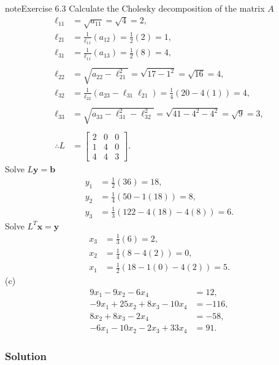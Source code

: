 \documentclass[letterpaper,10pt,english]{jupyterBook}
\begin{document}
\begin{sphinxadmonition}{note}{Exercise 6.3}
\sphinxAtStartPar
Calculate the Cholesky decomposition of the matrix \(A\)
\begin{align*}
    \ell_{11} &= \sqrt{ a_{11} } = \sqrt{ 4 } = 2, \\
    \ell_{21} &= \frac{1}{\ell_{11}} \left( a_{12} \right) = \frac{1}{2} \left( 2 \right) = 1, \\
    \ell_{31} &= \frac{1}{\ell_{11}} \left( a_{13} \right) = \frac{1}{2} \left( 8 \right) = 4, \\
    \\
    \ell_{22} &= \sqrt{ a_{22} - \ell_{21}^2 } = \sqrt{ 17 - 1^2 } = \sqrt{ 16 } = 4, \\
    \ell_{32} &= \frac{1}{\ell_{22}} \left( a_{23} - \ell_{31} \ell_{21} \right) = \frac{1}{4} \left( 20 - 4 \left( 1 \right) \right) = 4, \\
    \\
    \ell_{33} &= \sqrt{ a_{33} - \ell_{31}^2 - \ell_{32}^2 } = \sqrt{ 41 - 4^2 - 4^2 } = \sqrt{ 9 } = 3, \\
    \\
    \therefore L &= \left[\begin{matrix}2 & 0 & 0\\1 & 4 & 0\\4 & 4 & 3\end{matrix}\right].
\end{align*}
\sphinxAtStartPar
Solve \(L \mathbf{y} = \mathbf{b}\)
\begin{align*}
    y_{1} &= \frac{1}{2} \left( 36\right) = 18, \\
    y_{2} &= \frac{1}{4} \left( 50 - 1 \left( 18 \right)\right) = 8, \\
    y_{3} &= \frac{1}{3} \left( 122 - 4 \left( 18 \right) - 4 \left( 8 \right)\right) = 6.
\end{align*}
\sphinxAtStartPar
Solve \(L^T \mathbf{x} = \mathbf{y}\)
\begin{align*}
    x_{3} &= \frac{1}{3} \left(6 \right) = 2, \\
    x_{2} &= \frac{1}{4} \left(8 - 4 \left( 2 \right) \right) = 0, \\
    x_{1} &= \frac{1}{2} \left(18 - 1 \left( 0 \right) - 4 \left( 2 \right) \right) = 5.
\end{align*}
\sphinxAtStartPar
(c)
\begin{align*}
    9x_1 -9x_2 -6x_4 &=12,\\
    -9x_1 +25x_2 +8x_3 -10x_4 &=-116,\\
    8x_2 +8x_3 -2x_4 &=-58,\\
    -6x_1 -10x_2 -2x_3 +33x_4 &=91.
\end{align*}\subsubsection*{Solution}


\end{sphinxadmonition}
\end{document}
